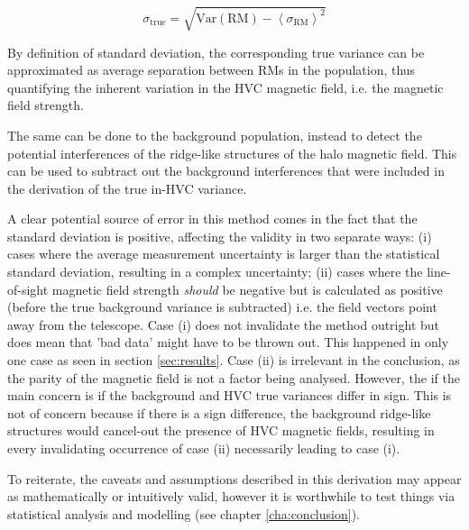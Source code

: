 \begin{equation}
    \sigma_{\mathrm{true}} = \sqrt{\mathrm{Var}\left(\mathrm{RM}\right) - {\left<\sigma_{\mathrm{RM}}\right>}^2}
\label{eq:var_sub_2}
\end{equation}


By definition of standard deviation, the corresponding true variance can be approximated as average separation between RMs in the population, thus quantifying the inherent variation in the HVC magnetic field, i.e. the magnetic field strength.


The same can be done to the background population, instead to detect the potential interferences of the ridge-like structures of the halo magnetic field. This can be used to subtract out the background interferences that were included in the derivation of the true in-HVC variance.


A clear potential source of error in this method comes in the fact that the standard deviation is positive, affecting the validity in two separate ways: (i) cases where the average measurement uncertainty is larger than the statistical standard deviation, resulting in a complex uncertainty; (ii) cases where the line-of-sight magnetic field strength \textit{should} be negative but is calculated as positive (before the true background variance is subtracted) i.e. the field vectors point away from the telescope. Case (i) does not invalidate the method outright but does mean that 'bad data' might have to be thrown out. This happened in only one case as seen in section \ref{sec:results}. Case (ii) is irrelevant in the conclusion, as the parity of the magnetic field is not a factor being analysed. However, the if the main concern is if the background and HVC true variances differ in sign. This is not of concern because if there is a sign difference, the background ridge-like structures would cancel-out the presence of HVC magnetic fields, resulting in every invalidating occurrence of case (ii) necessarily leading to case (i).


To reiterate, the caveats and assumptions described in this derivation may appear as mathematically or intuitively valid, however it is worthwhile to test things via statistical analysis and modelling (see chapter \ref{cha:conclusion}).

